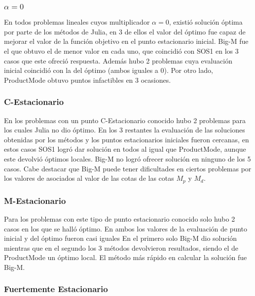 \subsubsection{$\alpha =0$}

En todos problemas lineales cuyos multiplicador $\alpha=0$, existió solución óptima 
por parte de los métodos de Julia, en 3 de ellos el valor del óptimo fue capaz de mejorar el valor de la función objetivo en el punto estacionario inicial. Big-M fue el que obtuvo el de menor valor en cada uno, que coincidió con SOS1 en los 3 casos que este ofreció respuesta. Además hubo 2 problemas cuya evaluación inicial coincidió con la del óptimo (ambos iguales a 0). Por otro lado, ProductMode obtuvo puntos infactibles en 3 ocasiones. 




\subsubsection{C-Estacionario}

En los problemas con un punto C-Estacionario conocido hubo 2 problemas para los cuales Julia no dio óptimo. En los 3 restantes la evaluación de las soluciones obtenidas por los métodos  y los puntos estacionarios iniciales fueron cercanas, en estos casos SOS1 logró dar solución en todos al igual que ProductMode, aunque este devolvió óptimos locales. Big-M no logró ofrecer solución en ninguno de los 5 casos. Cabe destacar que Big-M puede tener dificultades en ciertos problemas por los valores de asociados al valor de las cotas de las cotas $M_p$ y $M_d$.



\subsubsection{M-Estacionario}

Para los problemas con este tipo de punto estacionario conocido solo hubo 2 casos en los que se halló óptimo.
En ambos los valores de la evaluación de punto inicial y del óptimo fueron casi iguales 
En el primero solo Big-M dio solución mientras que en el segundo los 3 métodos devolvieron resultados, 
siendo el de ProductMode un óptimo local. El método más rápido en calcular la solución fue Big-M.

  
\subsubsection{Fuertemente Estacionario}

